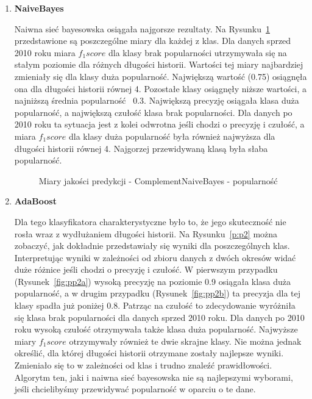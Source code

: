 \documentclass[polish,12pt]{aghthesis}
\begin{document}
\begin{enumerate}
    \item \textbf{NaiveBayes}
    
    Naiwna sieć bayesowska osiągała najgorsze rezultaty. Na Rysunku~\ref{fig:nbp1} przedstawione są poszczególne miary dla każdej z klas. Dla danych sprzed 2010 roku miara \textit{$f_1 score$} dla klasy brak popularności utrzymywała się na stałym poziomie dla różnych długości historii. Wartości tej miary najbardziej zmieniały się dla klasy duża popularność. Największą wartość (0.75) osiągnęła ona dla długości historii równej 4. Pozostałe klasy osiągnęły niższe wartości, a najniższą średnia popularność ~0.3. Największą precyzję osiągała klasa duża popularność, a największą czułość klasa brak popularności. Dla danych po 2010 roku ta sytuacja jest z kolei odwrotna jeśli chodzi o precyzję i czułość, a miara \textit{$f_1 score$} dla klasy duża popularność była również najwyższa dla długości historii równej 4. Najgorzej przewidywaną klasą była słaba popularność.
    
    
    \begin{figure}[ht] 
    \centering
    \hfill%
    \caption{Miary jakości predykcji - ComplementNaiveBayes - popularność}
    \label{fig:nbp1}
\end{figure}
\FloatBarrier

    \item \textbf{AdaBoost}
    
    Dla tego klasyfikatora charakterystyczne było to, że jego skuteczność nie rosła wraz z wydłużaniem długości historii. Na Rysunku~\ref{p:p2} można zobaczyć, jak dokładnie przedstawiały się wyniki dla poszczególnych klas. Interpretując wyniki w zależności od zbioru danych z dwóch okresów widać duże różnice jeśli chodzi o precyzję i czułość. W pierwszym przypadku (Rysunek~\ref{fig:pp2a}) wysoką precyzję na poziomie 0.9 osiągała klasa duża popularność, a w drugim przypadku (Rysunek~\ref{fig:pp2b}) ta precyzja dla tej klasy spadła już poniżej 0.8. Patrząc na czułość to zdecydowanie wyróżniła się klasa brak popularności dla danych sprzed 2010 roku. Dla danych po 2010 roku wysoką czułość otrzymywała także klasa duża popularność. Najwyższe miary \textit{$f_1 score$} otrzymywały również te dwie skrajne klasy. Nie można jednak określić, dla której długości historii otrzymane zostały najlepsze wyniki. Zmieniało się to w zależności od klas i trudno znaleźć prawidłowości. Algorytm ten, jaki i naiwna sieć bayesowska nie są najlepszymi wyborami, jeśli chcielibyśmy przewidywać popularność w oparciu o te dane.
    

\end{enumerate}
\end{document}
